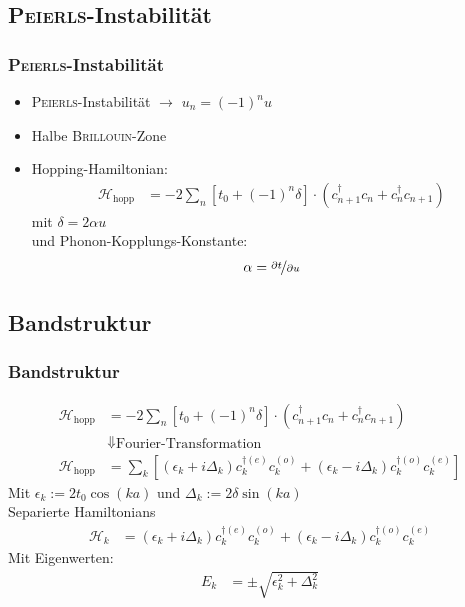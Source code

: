 \subsection{\textsc{Peierls}-Instabilität}
\begin{frame}
\frametitle{\textsc{Peierls}-Instabilität}
\centering
{}
\begin{itemize}
	\item \textsc{Peierls}-Instabilität $\to$ $u_n = (-1)^nu$
	\item Halbe \textsc{Brillouin}-Zone
	\item Hopping-Hamiltonian:
	\begin{align*}
		\mathcal{H}_\text{hopp} &= -2\sum_n \left[t_0 + (-1)^n\delta\right]\cdot\left(c_{n+1}^\dagger c_n + c_n^\dagger c_{n+1}\right)
	\end{align*}
	mit $\delta = 2\alpha u$\\
	und Phonon-Kopplungs-Konstante:
	\begin{align*}
		\alpha = \nicefrac{\partial t}{\partial u}
	\end{align*}
\end{itemize}
\end{frame}

\subsection{Bandstruktur}
\begin{frame}
\frametitle{Bandstruktur}
\begin{align*}
\mathcal{H}_\text{hopp} &= -2\sum_n \left[t_0 + (-1)^n\delta\right]\cdot\left(c_{n+1}^\dagger c_n + c_n^\dagger c_{n+1}\right)\\
&\Downarrow\text{Fourier-Transformation}\\
\mathcal{H}_\text{hopp} &= \sum_k \left[
\left(\epsilon_k + i\Delta_k\right)c_{k}^{\dagger(e)}c_{k}^{(o)} + \left(\epsilon_k-i\Delta_k \right)	c_{k}^{\dagger(o)}c_{k}^{(e)}\right]
\end{align*}
Mit $\epsilon_k := 2t_0\cos(ka)$ und $\Delta_k := 2\delta\sin(ka)$\\
Separierte Hamiltonians
\begin{align*}
	\mathcal{H}_k &= \left(\epsilon_k + i\Delta_k\right)c_{k}^{\dagger(e)}c_{k}^{(o)} + \left(\epsilon_k-i\Delta_k \right)	c_{k}^{\dagger(o)}c_{k}^{(e)}
\end{align*}
Mit Eigenwerten:
\begin{align*}
E_k &= \pm \sqrt{\epsilon_k^2+\Delta_k^2}
\label{equation_energy_band}
\end{align*}
\end{frame}


